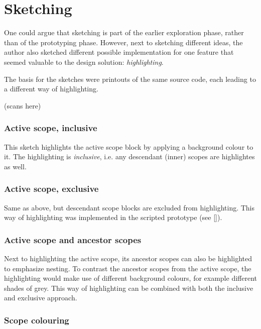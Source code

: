 \section{Sketching}\label{sketching}

One could argue that sketching is part of the earlier exploration phase,
rather than of the prototyping phase. However, next to sketching
different ideas, the author also sketched different possible
implementation for one feature that seemed valuable to the design
solution: \emph{highlighting}.

The basis for the sketches were printouts of the same source code, each
leading to a different way of highlighting.

(scans here)

\subsubsection{Active scope, inclusive}\label{active-scope-inclusive}

This sketch highlights the active scope block by applying a background
colour to it. The highlighting is \emph{inclusive}, i.e. any descendant
(inner) scopes are highlightes as well.

\subsubsection{Active scope, exclusive}\label{active-scope-exclusive}

Same as above, but descendant scope blocks are excluded from
highlighting. This way of highlighting was implemented in the scripted
prototype (see \ref{}).

\subsubsection{Active scope and ancestor
scopes}\label{active-scope-and-ancestor-scopes}

Next to highlighting the active scope, its ancestor scopes can also be
highlighted to emphasize nesting. To contrast the ancestor scopes from
the active scope, the highlighting would make use of different
background colours, for example different shades of grey. This way of
highlighting can be combined with both the inclusive and exclusive
approach.

\subsubsection{Scope colouring}\label{scope-colouring}

